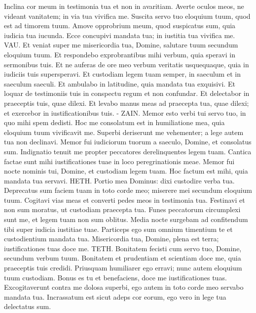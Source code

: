 \begin{biblechapter}
\verse Inclina cor meum in testimonia tua et non in avaritiam. 
\verse Averte oculos meos, ne videant vanitatem; in via tua vivifica me. 
\verse Suscita servo tuo eloquium tuum, quod est ad timorem tuum. 
\verse Amove opprobrium meum, quod suspicatus sum, quia iudicia tua iucunda. 
\verse Ecce concupivi mandata tua; in iustitia tua vivifica me. 
\verse VAU. Et veniat super me misericordia tua, Domine, salutare tuum secundum eloquium tuum. 
\verse Et respondebo exprobrantibus mihi verbum, quia speravi in sermonibus tuis. 
\verse Et ne auferas de ore meo verbum veritatis usquequaque, quia in iudiciis tuis supersperavi. 
\verse Et custodiam legem tuam semper, in saeculum et in saeculum saeculi. 
\verse Et ambulabo in latitudine, quia mandata tua exquisivi. 
\verse Et loquar de testimoniis tuis in conspectu regum et non confundar. 
\verse Et delectabor in praeceptis tuis, quae dilexi. 
\verse Et levabo manus meas ad praecepta tua, quae dilexi; et exercebor in iustificationibus tuis. - 
\verse ZAIN. Memor esto verbi tui servo tuo, in quo mihi spem dedisti. 
\verse Hoc me consolatum est in humiliatione mea, quia eloquium tuum vivificavit me. 
\verse Superbi deriserunt me vehementer; a lege autem tua non declinavi. 
\verse Memor fui iudiciorum tuorum a saeculo, Domine, et consolatus sum. 
\verse Indignatio tenuit me propter peccatores derelinquentes legem tuam. 
\verse Cantica factae sunt mihi iustificationes tuae in loco peregrinationis meae. 
\verse Memor fui nocte nominis tui, Domine, et custodiam legem tuam. 
\verse Hoc factum est mihi, quia mandata tua servavi. 
\verse HETH. Portio mea Dominus: dixi custodire verba tua. 
\verse Deprecatus sum faciem tuam in toto corde meo; miserere mei secundum eloquium tuum. 
\verse Cogitavi vias meas et converti pedes meos in testimonia tua. 
\verse Festinavi et non sum moratus, ut custodiam praecepta tua. 
\verse Funes peccatorum circumplexi sunt me, et legem tuam non sum oblitus. 
\verse Media nocte surgebam ad confitendum tibi super iudicia iustitiae tuae. 
\verse Particeps ego sum omnium timentium te et custodientium mandata tua. 
\verse Misericordia tua, Domine, plena est terra; iustificationes tuas doce me. 
\verse TETH. Bonitatem fecisti cum servo tuo, Domine, secundum verbum tuum. 
\verse Bonitatem et prudentiam et scientiam doce me, quia praeceptis tuis credidi. 
\verse Priusquam humiliarer ego erravi; nunc autem eloquium tuum custodiam. 
\verse Bonus es tu et benefaciens, doce me iustificationes tuas. 
\verse Excogitaverunt contra me dolosa superbi, ego autem in toto corde meo servabo mandata tua. 
\verse Incrassatum est sicut adeps cor eorum, ego vero in lege tua delectatus sum. 

\end{biblechapter}
